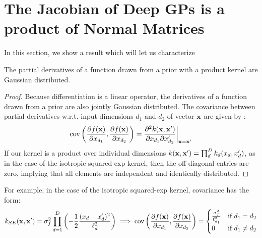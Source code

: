 \documentclass{article}
\begin{document}
\section{The Jacobian of Deep GPs is a product of \iid{} Normal Matrices}

In this section, we show a result which will let us characterize 

\begin{lemma}
The partial derivatives of a function drawn from a \gp{} prior with a product kernel are \iid Gaussian distributed.
\end{lemma}
%
\begin{proof}
Because differentiation is a linear operator, the derivatives of a function drawn from a \gp{} prior are also jointly Gaussian distributed.  The covariance between partial derivatives w.r.t. input dimensions $d_1$ and $d_2$ of vector ${\bf{x}}$ are given by \citep{Solak03derivativeobservations}:
%
\begin{align}
\operatorname{cov} \left( \frac{\partial f({\bf{x}})}{\partial x_{d_1}}, \frac{\partial f({\bf{x}})}{\partial x_{d_2}} \right) 
= \frac{\partial^2 k({\bf{x}}, {\bf{x}}')}{\partial x_{d_1} \partial x_{d_2}'} \bigg|_{{\bf{x}}={\bf{x}}'}
\end{align}
%
If our kernel is a product over individual dimensions $k({\bf{x}}, {\bf{x}}') = \prod_d^D k_d(x_d, x_d')$, as in the case of the isotropic squared-exp kernel, then the off-diagonal entries are zero, implying that all elements are independent and identically distributed.
\end{proof}

For example, in the case of the isotropic squared-exp kernel, covariance has the form:
\begin{align}
k_{SE}({\bf{x}}, {\bf{x}}') = \sigma^2_f \prod_{d=1}^D \left(-\frac{1}{2} \frac{(x_d - x_d')^2}{\ell_d^2} \right) \implies 
\operatorname{cov} \left( \frac{\partial f({\bf{x}})}{\partial x_{d_1}}, \frac{\partial f({\bf{x}})}{\partial x_{d_2}} \right) =
\begin{cases} 
\frac{\sigma^2_f}{\ell_{d_1}^2} & \mbox{if } d_1 = d_2 \\ 
0 & \mbox{if } d_1 \neq d_2 \end{cases}
\end{align}
\end{document}
